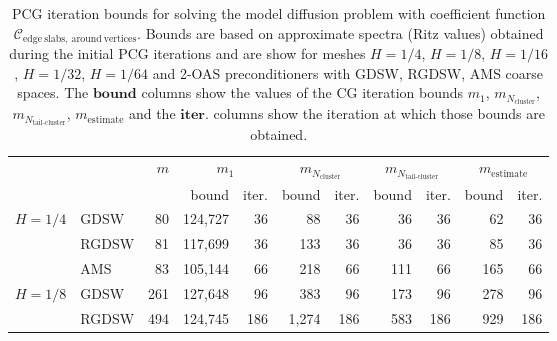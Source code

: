 \begin{table}[H]
\centering
\caption{PCG iteration bounds for solving the model diffusion problem with coefficient function $\mathcal{C}_{\mathrm{edge \ slabs, \ around \ vertices}}$. Bounds are based on approximate spectra (Ritz values) obtained during the initial PCG iterations and are show for meshes $H=1/4$, $H=1/8$, $H=1/16$, $H=1/32$, $H=1/64$ and 2-OAS preconditioners with GDSW, RGDSW, AMS coarse spaces. The $\textbf{bound}$ columns show the values of the CG iteration bounds $m_1$, $m_{N_{\text{cluster}}}$, $m_{N_{\text{tail-cluster}}}$, $m_{\text{estimate}}$ and the $\textbf{iter.}$ columns show the iteration at which those bounds are obtained.}
\label{tab:cg_iteration_bound_coef=slabs_around_vertices}
\begin{tabular}{llrrrrrrrrr}
\toprule
 &  & \bfseries $m$ & \multicolumn{2}{|c|}{\bfseries $m_1$} & \multicolumn{2}{|c|}{\bfseries $m_{N_{\text{cluster}}}$} & \multicolumn{2}{|c|}{\bfseries $m_{N_{\text{tail-cluster}}}$} & \multicolumn{2}{|c|}{\bfseries $m_{\text{estimate}}$} \\
 &  &  & bound & iter. & bound & iter. & bound & iter. & bound & iter. \\
\midrule
\multirow[c]{3}{*}{\bfseries $H=1/4$} & GDSW & 80 & {\cellcolor[HTML]{E2E4FB}} \color[HTML]{000000} 124,727 & 36 & {\cellcolor[HTML]{405FE5}} \color[HTML]{F1F1F1} 88 & 36 & {\cellcolor[HTML]{ACB8F4}} \color[HTML]{000000} 36 & 36 & {\cellcolor[HTML]{768BEC}} \color[HTML]{F1F1F1} 62 & 36 \\
\cline{2-11}
\bfseries  & RGDSW & 81 & {\cellcolor[HTML]{E2E4FB}} \color[HTML]{000000} 117,699 & 36 & {\cellcolor[HTML]{ACB8F4}} \color[HTML]{000000} 133 & 36 & {\cellcolor[HTML]{768BEC}} \color[HTML]{F1F1F1} 36 & 36 & {\cellcolor[HTML]{405FE5}} \color[HTML]{F1F1F1} 85 & 36 \\
\cline{2-11}
\bfseries  & AMS & 83 & {\cellcolor[HTML]{E2E4FB}} \color[HTML]{000000} 105,144 & 66 & {\cellcolor[HTML]{ACB8F4}} \color[HTML]{000000} 218 & 66 & {\cellcolor[HTML]{405FE5}} \color[HTML]{F1F1F1} 111 & 66 & {\cellcolor[HTML]{768BEC}} \color[HTML]{F1F1F1} 165 & 66 \\
\cline{1-11} \cline{2-11}
\multirow[c]{3}{*}{\bfseries $H=1/8$} & GDSW & 261 & {\cellcolor[HTML]{E2E4FB}} \color[HTML]{000000} 127,648 & 96 & {\cellcolor[HTML]{ACB8F4}} \color[HTML]{000000} 383 & 96 & {\cellcolor[HTML]{768BEC}} \color[HTML]{F1F1F1} 173 & 96 & {\cellcolor[HTML]{405FE5}} \color[HTML]{F1F1F1} 278 & 96 \\
\cline{2-11}
\bfseries  & RGDSW & 494 & {\cellcolor[HTML]{E2E4FB}} \color[HTML]{000000} 124,745 & 186 & {\cellcolor[HTML]{ACB8F4}} \color[HTML]{000000} 1,274 & 186 & {\cellcolor[HTML]{405FE5}} \color[HTML]{F1F1F1} 583 & 186 & {\cellcolor[HTML]{768BEC}} \color[HTML]{F1F1F1} 929 & 186 \\

\end{tabular}
\end{table}
